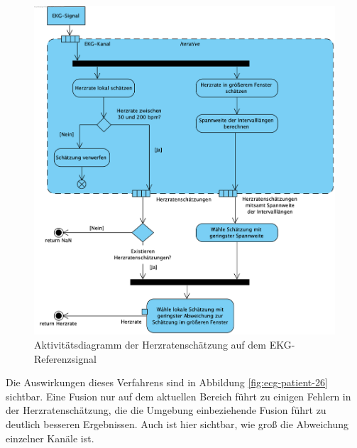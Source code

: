 	\begin{figure}[H]
		\centering
		\includegraphics[width=\textwidth]{pic/ecg-hr-estimation.png}
		\caption[Aktivitätsdiagramm der Herzratenschätzung auf dem EKG-Referenzsignal]{Aktivitätsdiagramm der Herzratenschätzung auf dem EKG-Referenzsignal}
		\label{fig:ecg-hr-estimation}
	\end{figure}

	
	Die Auswirkungen dieses Verfahrens sind in Abbildung \ref{fig:ecg-patient-26} sichtbar. Eine Fusion nur auf dem aktuellen Bereich führt zu einigen Fehlern in der Herzratenschätzung, die die Umgebung einbeziehende Fusion führt zu deutlich besseren Ergebnissen. Auch ist hier sichtbar, wie groß die Abweichung einzelner Kanäle ist.

